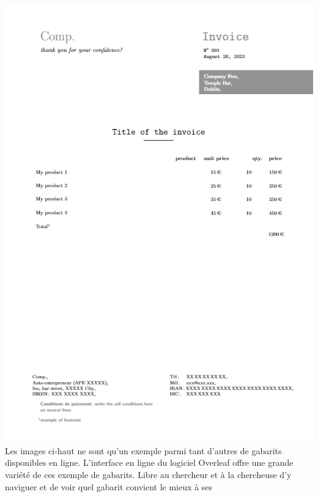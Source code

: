 \documentclass[
  letterpaper,
]{scrbook}
\begin{document}
{{{\protect\includegraphics{images/TStemp.png} Les images ci-haut ne sont
qu'un exemple parmi tant d'autres de gabarits disponibles en ligne.
L'interface en ligne du logiciel Overleaf offre une grande variété de
ces exemple de gabarits. Libre au chercheur et à la chercheuse d'y
naviguer et de voir quel gabarit convient le mieux à ses
}}}
\end{document}
